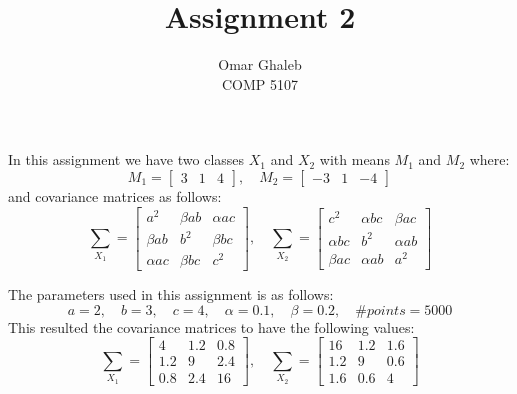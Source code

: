 \documentclass[11pt, oneside]{article}   	%
\title{Assignment 2}
\author{Omar Ghaleb\\
COMP 5107}
\date{}							%
\begin{document}
\renewcommand\thesubsection{\alph{subsection}.}
\maketitle
In this assignment we have two classes $X_1$ and $X_2$ with means $M_1$ and $M_2$ where: $$M_1 = \begin{bmatrix}
3 & 1 & 4 
\end{bmatrix},\quad M_2 = \begin{bmatrix}
-3 & 1 & -4 
\end{bmatrix}$$
  and covariance matrices as follows: 
  $$\sum_{X_1} = \begin{bmatrix}
a^2 & \beta ab & \alpha ac \\
\beta ab & b^2 & \beta bc \\
\alpha ac & \beta bc & c^2 
\end{bmatrix},\quad \sum_{X_2} = \begin{bmatrix}
c^2 & \alpha bc & \beta ac \\
\alpha bc & b^2 & \alpha ab \\
\beta ac & \alpha ab & a^2 
\end{bmatrix}$$

The parameters used in this assignment is as follows:
$$ a=2,\quad b=3,\quad c=4,\quad \alpha=0.1,\quad \beta=0.2,\quad \#points = 5000 $$
This resulted the covariance matrices to have the following values:
$$\sum_{X_1} = \begin{bmatrix}
4 & 1.2 & 0.8 \\
1.2 & 9 & 2.4 \\
0.8 & 2.4 & 16 
\end{bmatrix}, \quad \sum_{X_2} = \begin{bmatrix}
16 & 1.2 & 1.6 \\
1.2 & 9 & 0.6 \\
1.6 & 0.6 & 4 
\end{bmatrix}$$
\end{document}
